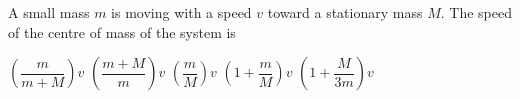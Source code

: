 \documentclass{../../../oss-apphys-exam}
\begin{document}
\begin{questions}

  \question A small mass $m$ is moving with a speed $v$ toward a stationary
  mass $M$. The speed of the centre of mass of the system is
  \begin{choices}
    \choice $\left(\dfrac m{m+M}\right)v$
    \choice $\left(\dfrac{m+M} m\right)v$
    \choice $\left(\dfrac mM\right)v$
    \choice $\left(1+\dfrac mM\right)v$
    \choice $\left(1+\dfrac M{3m}\right)v$
  \end{choices}
    


\end{questions}
\end{document}
